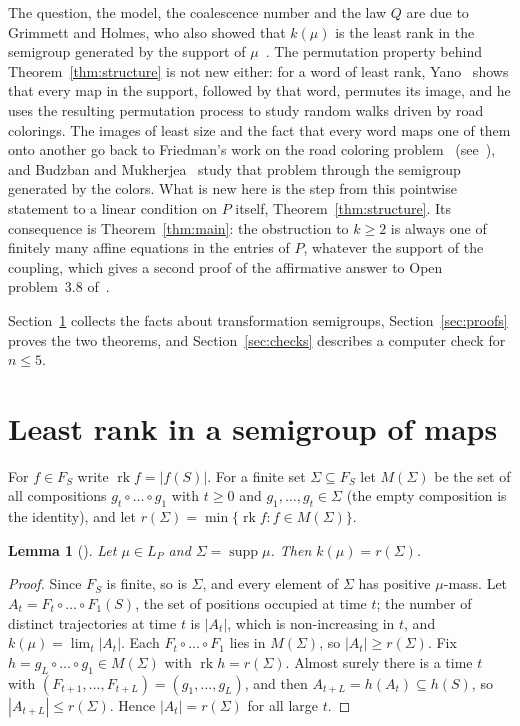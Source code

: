 \documentclass[11pt]{amsart}
\newtheorem{lemma}[theorem]{Lemma}
\theoremstyle{remark}
\newcommand{\rk}{\operatorname{rk}}
\begin{document}
The question, the model, the coalescence number and the law $Q$ are due to Grimmett and Holmes, who also showed that
$k(\mu)$ is the least rank in the semigroup generated by the support of $\mu$~\cite[Theorem~3(a)]{GH21}. The
permutation property behind Theorem~\ref{thm:structure} is not new either: for a word of least rank, Yano~\cite[\S4.2,
(4.6)--(4.9)]{Yan13} shows that every map in the support, followed by that word, permutes its image, and he uses the
resulting permutation process to study random walks driven by road colorings. The images of least size and the fact
that every word maps one of them onto another go back to Friedman's work on the road coloring problem~\cite{Fri90}
(see~\cite[Lemma~2.3]{Yan13}), and Budzban and Mukherjea~\cite{BM00} study that problem through the semigroup
generated by the colors. What is new here is the step from this pointwise statement to a linear condition on $P$ itself,
Theorem~\ref{thm:structure}. Its consequence is Theorem~\ref{thm:main}: the obstruction to $k\ge2$ is always one of
finitely many affine equations in the entries of $P$, whatever the support of the coupling, which gives a second
proof of the affirmative answer to Open problem~3.8 of~\cite{GH26}.

Section~\ref{sec:semigroup} collects the facts about transformation semigroups, Section~\ref{sec:proofs} proves the two
theorems, and Section~\ref{sec:checks} describes a computer check for $n\le5$.

\section{Least rank in a semigroup of maps}\label{sec:semigroup}

For $f\in F_S$ write $\rk f=|f(S)|$. For a finite set $\Sigma\subseteq F_S$ let $M(\Sigma)$ be the set of all
compositions $g_t\circ\dots\circ g_1$ with $t\ge0$ and $g_1,\dots,g_t\in\Sigma$ (the empty composition is the identity),
and let $r(\Sigma)=\min\{\rk f:f\in M(\Sigma)\}$.

\begin{lemma}[{\cite[Theorem~3(a)]{GH21}}]\label{lem:rank}
Let $\mu\in L_P$ and $\Sigma=\operatorname{supp}\mu$. Then $k(\mu)=r(\Sigma)$.
\end{lemma}

\begin{proof}
Since $F_S$ is finite, so is $\Sigma$, and every element of $\Sigma$ has positive $\mu$-mass. Let
$A_t=F_t\circ\dots\circ F_1(S)$, the set of positions occupied at time $t$; the number of distinct trajectories at time
$t$ is $|A_t|$, which is non-increasing in $t$, and $k(\mu)=\lim_t|A_t|$. Each $F_t\circ\dots\circ F_1$ lies in
$M(\Sigma)$, so $|A_t|\ge r(\Sigma)$. Fix $h=g_L\circ\dots\circ g_1\in M(\Sigma)$ with $\rk h=r(\Sigma)$. Almost surely
there is a time $t$ with $(F_{t+1},\dots,F_{t+L})=(g_1,\dots,g_L)$, and then
$A_{t+L}=h(A_t)\subseteq h(S)$, so $|A_{t+L}|\le r(\Sigma)$. Hence $|A_t|=r(\Sigma)$ for all large $t$.
\end{proof}
\end{document}
